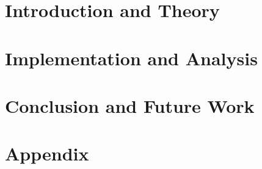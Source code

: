 \documentclass[11pt,a4paper,bibtotoc,idxtotoc,headsepline,footsepline,footexclude,BCOR12mm,DIV13]{scrbook}
\begin{document}
	\frontmatter
	
	
	
%	
%	
	
	
%	
	\clearemptydoublepage
	
	
	
	
	
	
	
	
	

	\tableofcontents
	
	\listoffigures
	
	\listoftables
  
  

	\mainmatter
	
	
		\part[The 1st Part]{Introduction and Theory}
		\label{part:introAndBackgroundTheory}
		
		
		
		
		
		\part[The 2nd Part]{Implementation and Analysis}
		\label{part:secondP}
		
		
		
		
		
		
		\part[The 3rd Part]{Conclusion and Future Work}
				
		
		\part*{Appendix}
		
		\appendix %
		
		
		
	


  \clearemptydoublepage
  
	
	
 
\end{document}
